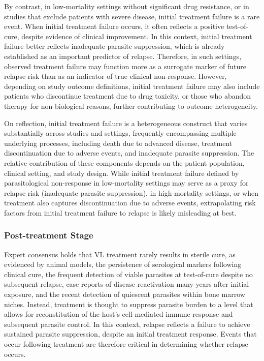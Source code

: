 By contrast, in low-mortality settings without significant drug resistance, or in studies that exclude patients with severe disease, initial treatment failure is a rare event. When initial treatment failure occurs, it often reflects a positive test-of-cure, despite evidence of clinical improvement\cite{sundar2012,musa2023}. In this context, initial treatment failure better reflects inadequate parasite suppression, which is already established as an important predictor of relapse\cite{sudarshan2011,verrest2021,verrest2024}. Therefore, in such settings, observed treatment failure may function more as a surrogate marker of future relapse risk than as an indicator of true clinical non-response. However, depending on study outcome definitions, initial treatment failure may also include patients who discontinue treatment due to drug toxicity, or those who abandon therapy for non-biological reasons, further contributing to outcome heterogeneity.

On reflection, initial treatment failure is a heterogeneous construct that varies substantially across studies and settings, frequently encompassing multiple underlying processes, including death due to advanced disease, treatment discontinuation due to adverse events, and inadequate parasite suppression. The relative contribution of these components depends on the patient population, clinical setting, and study design. While initial treatment failure defined by parasitological non-response in low-mortality settings may serve as a proxy for relapse risk (inadequate parasite suppression), in high-mortality settings, or when treatment also captures discontinuation due to adverse events, extrapolating risk factors from initial treatment failure to relapse is likely misleading at best.

\subsubsection{Post-treatment Stage}

Expert consensus holds that VL treatment rarely results in sterile cure, as evidenced by animal models\cite{murray1996}, the persistence of serological markers following clinical cure\cite{gidwani2011}, the frequent detection of viable parasites at test-of-cure despite no subsequent relapse\cite{verrest2021}, case reports of disease reactivation many years after initial exposure\cite{eichenberger2017, postorino2011}, and the recent detection of quiescent parasites within bone marrow niches\cite{dirkx2024}. Instead, treatment is thought to suppress parasite burden to a level that allows for reconstitution of the host's cell-mediated immune response and subsequent parasite control\cite{murray1996, khalil2005}. In this context, relapse reflects a failure to achieve sustained parasite suppression, despite an initial treatment response. Events that occur following treatment are therefore critical in determining whether relapse occurs.

